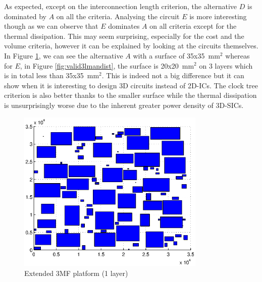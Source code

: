 As expected, except on the interconnection length criterion, the alternative $D$ is dominated by $A$ on all the criteria. Analysing the circuit $E$ is more interesting though as we can observe that $E$ dominates $A$ on all criteria except for the thermal dissipation. This may seem surprising, especially for the cost and the volume criteria, however it can be explained by looking at the circuits themselves. In Figure \ref{fig:valid1lmandist}, we can see the alternative $A$ with a surface of \texttildelow 35x35~mm$^2$ whereas for $E$, in Figure \ref{fig:valid3lmandist}, the surface is \texttildelow 20x20~mm$^2$ on 3 layers which is in total less than 35x35~mm$^2$. This is indeed not a big difference but it can show when it is interesting to design 3D circuits instead of 2D-ICs. The clock tree criterion is also better thanks to the smaller surface while the thermal dissipation is unsurprisingly worse due to the inherent greater power density of 3D-SICs. 

\begin{figure}[h!]
\begin{center}
\includegraphics[width=0.8\textwidth]{valid1lmandist.eps}
\caption{Extended 3MF platform (1 layer)}
\label{fig:valid1lmandist}
\end{center}
\end{figure}

